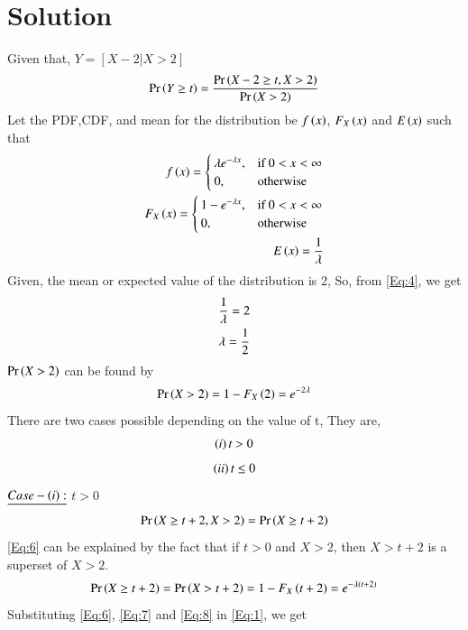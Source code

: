 \documentclass[journal,12pt,twocolumn]{IEEEtran}
\begin{document}
\section{Solution}
Given that, $Y=[X-2|X>2]$
\begin{align}
\Pr\left(Y \geq t\right) = \frac{\Pr\left(X-2 \geq t, X>2\right)}{\Pr\left(X>2\right)} \label{Eq:1}
\end{align}
Let the PDF,CDF, and mean for the distribution be $f\left(x\right)$, $F_X\left(x\right)$ and $E\left(x\right)$ such that
\begin{align}
f\left(x\right) = \begin{cases} \label{Eq:2}
			\lambda e^{-\lambda x}, & \text{if $0 < x< \infty $}\\
            0, & \text{otherwise}
		 \end{cases} \\
F_X\left(x\right) = \begin{cases} \label{Eq:3}
			1 - e^{-\lambda x}, & \text{if $0 < x< \infty $}\\
            0, & \text{otherwise}
		 \end{cases} \\
E\left(x\right) = \frac{1}{\lambda} \label{Eq:4}
\end{align}
Given, the mean or expected value of the distribution is 2, So, from \eqref{Eq:4}, we get
\begin{align}
\frac{1}{\lambda} = 2 \notag \\
\lambda = \frac{1}{2} \label{Eq:5}
\end{align}
$\Pr\left(X > 2\right)$ can be found by
\begin{align}
\Pr\left(X >2\right) = 1- F_X\left(2\right) = e^{-2\lambda} \label{Eq:7} 
\end{align}
There are two cases possible depending on the value of t, They are,
\begin{align}
\left(i\right) t>0 \notag
\end{align}
\begin{align}
\left(ii\right) t\leq 0 \notag
\end{align}
$\underline{Case-\left(i\right):}$ $t>0$
\begin{align}
\Pr\left(X \geq t+2,X>2\right) = \Pr\left(X \geq t+2\right) \label{Eq:6}
\end{align}
\eqref{Eq:6} can be explained by the fact that if $t>0$ and $X>2$, then $X>t+2$ is a superset of $X>2$.
\begin{align}
\Pr\left(X \geq t+2\right) = \Pr\left(X > t+2\right) = 1- F_X\left(t+2\right) = e^{-\lambda \left(t+2\right)}\label{Eq:8}
\end{align}
Substituting \eqref{Eq:6}, \eqref{Eq:7} and \eqref{Eq:8} in \eqref{Eq:1}, we get
\end{document}
